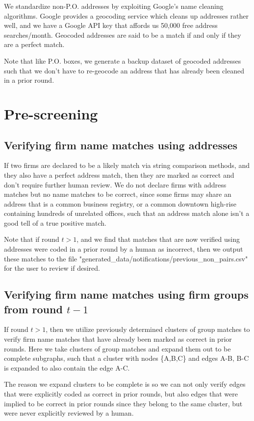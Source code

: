 \documentclass{article}
\begin{document}
We standardize non-P.O. addresses by exploiting Google's name cleaning algorithms. Google provides a geocoding service which cleans up addresses rather well, and we have a Google API key that affords us 50,000 free address searches/month. Geocoded addresses are said to be a match if and only if they are a perfect match. 

Note that like P.O. boxes, we generate a backup dataset of geocoded addresses such that we don't have to re-geocode an address that has already been cleaned in a prior round. 

\section{Pre-screening}

\subsection{Verifying firm name matches using addresses}

If two firms are declared to be a likely match via string comparison methods, and they also have a perfect address match, then they are marked as correct and don't require further human review. We do not declare firms with address matches but no name matches to be correct, since some firms may share an address that is a common business registry, or a common downtown high-rise containing hundreds of unrelated offices, such that an address match alone isn't a good tell of a true positive match. 

Note that if round $t > 1$, and we find that matches that are now verified using addresses were coded in a prior round by a human as incorrect, then we output these matches to the file "generated\_data/notifications/previous\_non\_pairs.csv" for the user to review if desired. 

\subsection{Verifying firm name matches using firm groups from round $t - 1$}

If round $t > 1$, then we utilize previously determined clusters of group matches to verify firm name matches that have already been marked as correct in prior rounds. Here we take clusters of group matches and expand them out to be complete subgraphs, such that a cluster with nodes \{A,B,C\} and edges A-B, B-C is expanded to also contain the edge A-C. 

The reason we expand clusters to be complete is so we can not only verify edges that were explicitly coded as correct in prior rounds, but also edges that were implied to be correct in prior rounds since they belong to the same cluster, but were never explicitly reviewed by a human. 
\end{document}
